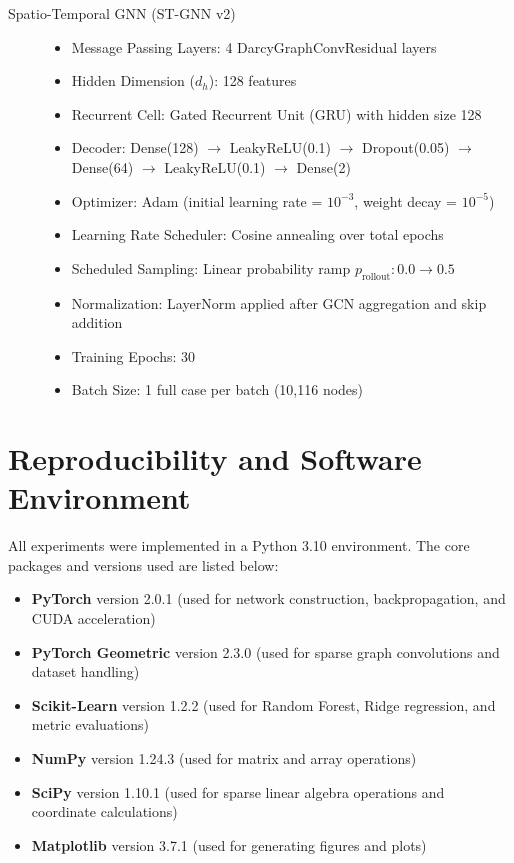 \documentclass[10pt,twocolumn]{article}
\begin{document}
\begin{description}
    \item[Spatio-Temporal GNN (ST-GNN v2)]
    \begin{itemize}
        \item Message Passing Layers: 4 DarcyGraphConvResidual layers
        \item Hidden Dimension ($d_h$): 128 features
        \item Recurrent Cell: Gated Recurrent Unit (GRU) with hidden size 128
        \item Decoder: Dense(128) $\to$ LeakyReLU(0.1) $\to$ Dropout(0.05) $\to$ Dense(64) $\to$ LeakyReLU(0.1) $\to$ Dense(2)
        \item Optimizer: Adam (initial learning rate = $10^{-3}$, weight decay = $10^{-5}$)
        \item Learning Rate Scheduler: Cosine annealing over total epochs
        \item Scheduled Sampling: Linear probability ramp $p_{\text{rollout}} : 0.0 \to 0.5$
        \item Normalization: LayerNorm applied after GCN aggregation and skip addition
        \item Training Epochs: 30
        \item Batch Size: 1 full case per batch (10,116 nodes)
    \end{itemize}
\end{description}

\section{Reproducibility and Software Environment}
\label{sec:reproducibility}

All experiments were implemented in a Python 3.10 environment. The core packages and versions used are listed below:

\begin{itemize}
    \item \textbf{PyTorch} version 2.0.1 (used for network construction, backpropagation, and CUDA acceleration)
    \item \textbf{PyTorch Geometric} version 2.3.0 (used for sparse graph convolutions and dataset handling)
    \item \textbf{Scikit-Learn} version 1.2.2 (used for Random Forest, Ridge regression, and metric evaluations)
    \item \textbf{NumPy} version 1.24.3 (used for matrix and array operations)
    \item \textbf{SciPy} version 1.10.1 (used for sparse linear algebra operations and coordinate calculations)
    \item \textbf{Matplotlib} version 3.7.1 (used for generating figures and plots)
\end{itemize}
\end{document}
